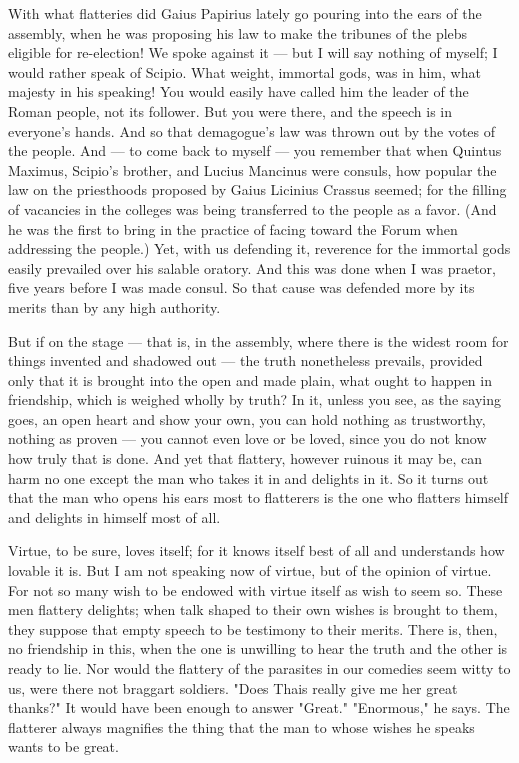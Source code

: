  With what flatteries did Gaius Papirius lately go pouring into the ears of the assembly, when he was proposing his law to make the tribunes of the plebs eligible for re-election! We spoke against it — but I will say nothing of myself; I would rather speak of Scipio. What weight, immortal gods, was in him, what majesty in his speaking! You would easily have called him the leader of the Roman people, not its follower. But you were there, and the speech is in everyone's hands. And so that demagogue's law was thrown out by the votes of the people. And — to come back to myself — you remember that when Quintus Maximus, Scipio's brother, and Lucius Mancinus were consuls, how popular the law on the priesthoods proposed by Gaius Licinius Crassus seemed; for the filling of vacancies in the colleges was being transferred to the people as a favor. (And he was the first to bring in the practice of facing toward the Forum when addressing the people.) Yet, with us defending it, reverence for the immortal gods easily prevailed over his salable oratory. And this was done when I was praetor, five years before I was made consul. So that cause was defended more by its merits than by any high authority.

 But if on the stage — that is, in the assembly, where there is the widest room for things invented and shadowed out — the truth nonetheless prevails, provided only that it is brought into the open and made plain, what ought to happen in friendship, which is weighed wholly by truth? In it, unless you see, as the saying goes, an open heart and show your own, you can hold nothing as trustworthy, nothing as proven — you cannot even love or be loved, since you do not know how truly that is done. And yet that flattery, however ruinous it may be, can harm no one except the man who takes it in and delights in it. So it turns out that the man who opens his ears most to flatterers is the one who flatters himself and delights in himself most of all.

 Virtue, to be sure, loves itself; for it knows itself best of all and understands how lovable it is. But I am not speaking now of virtue, but of the opinion of virtue. For not so many wish to be endowed with virtue itself as wish to seem so. These men flattery delights; when talk shaped to their own wishes is brought to them, they suppose that empty speech to be testimony to their merits. There is, then, no friendship in this, when the one is unwilling to hear the truth and the other is ready to lie. Nor would the flattery of the parasites in our comedies seem witty to us, were there not braggart soldiers. "Does Thais really give me her great thanks?" It would have been enough to answer "Great." "Enormous," he says. The flatterer always magnifies the thing that the man to whose wishes he speaks wants to be great.

